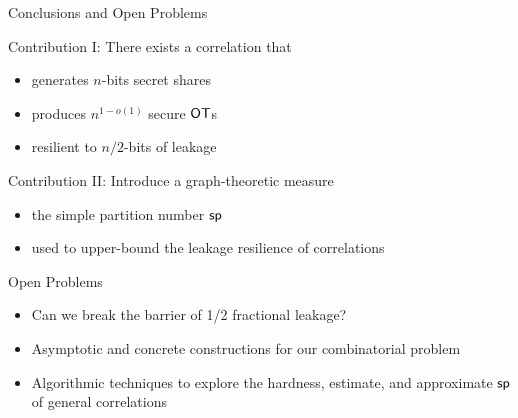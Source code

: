 \begin{frame}{Conclusions and Open Problems}

	{
		\begin{block} {Contribution I: There exists a correlation that}
			\begin{itemize}
				\item generates $ n $-bits secret shares
				\item produces $ n^{1-o(1)} $ secure $\OT$s
				\item resilient to $ n/2 $-bits of leakage 
			\end{itemize}
		\end{block}
		
		\pause
		
		\begin{block} {Contribution II: Introduce a graph-theoretic measure}
			\begin{itemize}
				\item the simple partition number $ \mathsf{sp} $
				\item used to upper-bound the leakage resilience of correlations 
			\end{itemize}
		\end{block}
		
	}

	\pause

	{
	\begin{block}{Open Problems}
		\begin{itemize}
			\item Can we break the barrier of 1/2 fractional leakage?
			\item Asymptotic and concrete constructions for our combinatorial problem
			\item Algorithmic techniques to explore the hardness, estimate, and approximate $ \mathsf{sp} $ of general correlations
		\end{itemize}		
	\end{block}
	}
\end{frame}
